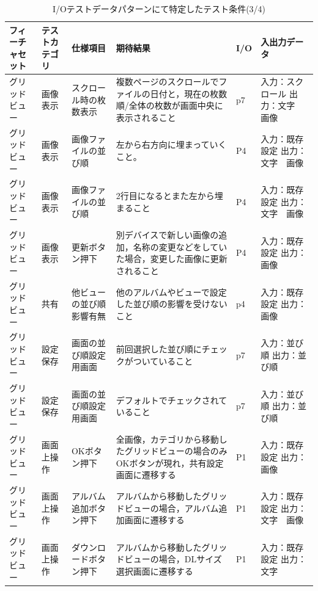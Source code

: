 \begin{table}[htbp]
  \scriptsize
  \centering
  \caption{I/Oテストデータパターンにて特定したテスト条件(3/4)}
  \begin{tabular}{|p{8em}|p{7em}|p{9em}|p{9em}|p{3em}|p{12em}|}
\cline{1-6}   フィーチャセット & テストカテゴリ  & 仕様項目 & 期待結果  & I/O   & 入出力データ \bigstrut\\
    \hline
    \hline
    グリッドビュー & 画像表示  & スクロール時の枚数表示 & 複数ページのスクロールでファイルの日付と，現在の枚数順/全体の枚数が画面中央に表示されること & p7    & 入力：スクロール
出力：文字　画像 \bigstrut\\
    \hline
    グリッドビュー & 画像表示  & 画像ファイルの並び順 & 左から右方向に埋まっていくこと。 & P4    & 入力：既存設定
出力：文字　画像 \bigstrut\\
    \hline
    グリッドビュー & 画像表示  & 画像ファイルの並び順 & 2行目になるとまた左から埋まること & P4    & 入力：既存設定
出力：文字　画像 \bigstrut\\
    \hline
    グリッドビュー & 画像表示  & 更新ボタン押下 & 別デバイスで新しい画像の追加，名称の変更などをしていた場合，変更した画像に更新されること & P4    & 入力：既存設定
出力：画像 \bigstrut\\
    \hline
    グリッドビュー & 共有    & 他ビューの並び順影響有無 & 他のアルバムやビューで設定した並び順の影響を受けないこと & p4    & 入力：既存設定
出力：画像 \bigstrut\\
    \hline
    グリッドビュー & 設定保存  & 画面の並び順設定用画面 & 前回選択した並び順にチェックがついていること & p7    & 入力：並び順
出力：並び順 \bigstrut\\
    \hline
    グリッドビュー & 設定保存  & 画面の並び順設定用画面 & デフォルトでチェックされていること & p7    & 入力：並び順
出力：並び順 \bigstrut\\
    \hline
    グリッドビュー & 画面上操作 & OKボタン押下 & 全画像，カテゴリから移動したグリッドビューの場合のみOKボタンが現れ，共有設定画面に遷移する & P1    & 入力：既存設定
出力：画像 \bigstrut\\
    \hline
    グリッドビュー & 画面上操作 & \multicolumn{1}{p{7.5em}|}{アルバム追加ボタン押下} & アルバムから移動したグリッドビューの場合，アルバム追加画面に遷移する & P1    & 入力：既存設定
出力：文字　画像 \bigstrut\\
    \hline
    グリッドビュー & 画面上操作 & ダウンロードボタン押下 & アルバムから移動したグリッドビューの場合，DLサイズ選択画面に遷移する & P1    & 入力：既存設定
出力：文字 \bigstrut\\

\end{tabular}
\end{table}
